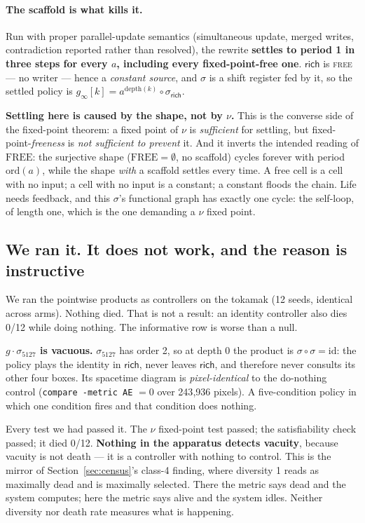 \documentclass[man,12pt,floatsintext]{apa7}
\newcommand{\sig}{\sigma}
\begin{document}
\paragraph{The scaffold is what kills it.}
Run with proper parallel-update semantics (simultaneous update, merged writes,
contradiction reported rather than resolved), the rewrite \textbf{settles to
period 1 in three steps for every $a$, including every fixed-point-free one}.
$\textsf{rich}$ is \textsc{free} --- no writer --- hence a \emph{constant source},
and $\sig$ is a shift register fed by it, so the settled policy is
$g_\infty[k] = a^{\mathrm{depth}(k)} \circ \sig_{\textsf{rich}}$.

\textbf{Settling here is caused by the shape, not by $\nu$.} This is the converse
side of the fixed-point theorem: a fixed point of $\nu$ is \emph{sufficient} for
settling, but fixed-point-\emph{freeness} is \emph{not sufficient to prevent} it.
And it inverts the intended reading of $\mathrm{FREE}$: the surjective shape
($\mathrm{FREE} = \emptyset$, no scaffold) cycles forever with period
$\mathrm{ord}(a)$, while the shape \emph{with} a scaffold settles every time. A
free cell is a cell with no input; a cell with no input is a constant; a constant
floods the chain. Life needs feedback, and this $\sig$'s functional graph has
exactly one cycle: the self-loop, of length one, which is the one demanding a
$\nu$ fixed point.

\subsection{We ran it. It does not work, and the reason is instructive}

We ran the pointwise products as controllers on the tokamak (12 seeds, identical
across arms). Nothing died. That is not a result: an identity controller also
dies 0/12 while doing nothing. The informative row is worse than a null.

\textbf{$g \cdot \sig_{5127}$ is vacuous.} $\sig_{5127}$ has order 2, so at depth 0
the product is $\sig \circ \sig = \mathrm{id}$: the policy plays the identity in
$\textsf{rich}$, never leaves $\textsf{rich}$, and therefore never consults its
other four boxes. Its spacetime diagram is \emph{pixel-identical} to the
do-nothing control (\texttt{compare -metric AE} $= 0$ over 243{,}936 pixels). A
five-condition policy in which one condition fires and that condition does nothing.

Every test we had passed it. The $\nu$ fixed-point test passed; the satisfiability
check passed; it died 0/12. \textbf{Nothing in the apparatus detects vacuity},
because vacuity is not death --- it is a controller with nothing to control. This
is the mirror of Section~\ref{sec:census}'s class-4 finding, where diversity 1
reads as maximally dead and is maximally selected. There the metric says dead and
the system computes; here the metric says alive and the system idles. Neither
diversity nor death rate measures what is happening.
\end{document}
